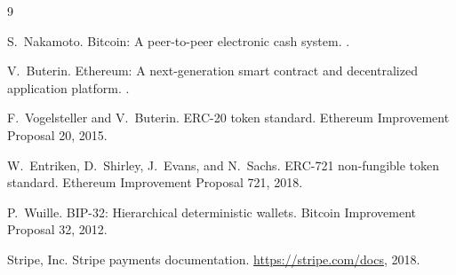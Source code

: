 \documentclass[11pt,letterpaper]{article}
\begin{document}
\begin{thebibliography}{9}

S.~Nakamoto.
\newblock Bitcoin: A peer-to-peer electronic cash system.
.

V.~Buterin.
\newblock Ethereum: A next-generation smart contract and decentralized
application platform.
.

F.~Vogelsteller and V.~Buterin.
\newblock ERC-20 token standard.
\newblock Ethereum Improvement Proposal 20, 2015.

W.~Entriken, D.~Shirley, J.~Evans, and N.~Sachs.
\newblock ERC-721 non-fungible token standard.
\newblock Ethereum Improvement Proposal 721, 2018.

P.~Wuille.
\newblock BIP-32: Hierarchical deterministic wallets.
\newblock Bitcoin Improvement Proposal 32, 2012.

Stripe, Inc.
\newblock Stripe payments documentation.
\newblock \url{https://stripe.com/docs}, 2018.

\end{thebibliography}
\end{document}
